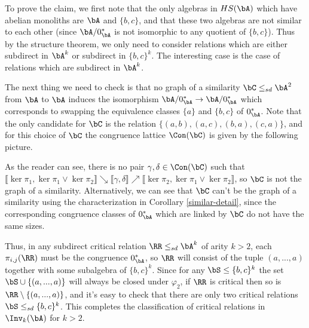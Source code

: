 \begin{ex}
To prove the claim, we first note that the only algebras in $HS(\bA)$ which have abelian monoliths are $\bA$ and $\{b,c\}$, and that these two algebras are not similar to each other (since $\bA/0_\bA^*$ is not isomorphic to any quotient of $\{b,c\}$). Thus by the structure theorem, we only need to consider relations which are either subdirect in $\bA^k$ or subdirect in $\{b,c\}^k$. The interesting case is the case of relations which are subdirect in $\bA^k$.

The next thing we need to check is that no graph of a similarity $\bC \le_{sd} \bA^2$ from $\bA$ to $\bA$ induces the isomorphism $\bA/0_\bA^* \rightarrow \bA/0_\bA^*$ which corresponds to swapping the equivalence classes $\{a\}$ and $\{b,c\}$ of $0_\bA^*$. Note that the only candidate for $\bC$ is the relation $\{(a,b),(a,c),(b,a),(c,a)\}$, and for this choice of $\bC$ the congruence lattice $\Con(\bC)$ is given by the following picture.
\begin{center}
\end{center}
As the reader can see, there is no pair $\gamma,\delta \in \Con(\bC)$ such that $\llbracket \ker \pi_1, \ker \pi_1 \vee \ker \pi_2 \rrbracket \searrow \llbracket \gamma, \delta \rrbracket \nearrow \llbracket \ker \pi_2, \ker \pi_1 \vee \ker \pi_2 \rrbracket$, so $\bC$ is not the graph of a similarity. Alternatively, we can see that $\bC$ can't be the graph of a similarity using the characterization in Corollary \ref{similar-detail}, since the corresponding congruence classes of $0_\bA^*$ which are linked by $\bC$ do not have the same sizes.

Thus, in any subdirect critical relation $\RR \le_{sd} \bA^k$ of arity $k > 2$, each $\pi_{i,j}(\RR)$ must be the congruence $0_\bA^*$, so $\RR$ will consist of the tuple $(a,...,a)$ together with some subalgebra of $\{b,c\}^k$. Since for any $\bS \le \{b,c\}^k$ the set $\bS \cup \{(a,...,a)\}$ will always be closed under $\varphi_2$, if $\RR$ is critical then so is $\RR \setminus \{(a,...,a)\}$, and it's easy to check that there are only two critical relations $\bS \le_{sd} \{b,c\}^k$. This completes the classification of critical relations in $\Inv_k(\bA)$ for $k > 2$.
\end{ex}

